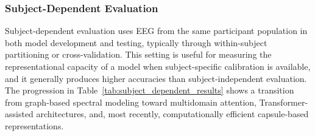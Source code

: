 \documentclass{WileyMSP-template}
\begin{document}
\subsubsection{Subject-Dependent Evaluation}
\label{subsubsec:subject_dependent_evaluation}

Subject-dependent evaluation uses EEG from the same participant population in both model development and testing, typically through within-subject partitioning or cross-validation. This setting is useful for measuring the representational capacity of a model when subject-specific calibration is available, and it generally produces higher accuracies than subject-independent evaluation. The progression in Table~\ref{tab:subject_dependent_results} shows a transition from graph-based spectral modeling toward multidomain attention, Transformer-assisted architectures, and, most recently, computationally efficient capsule-based representations.
\end{document}

